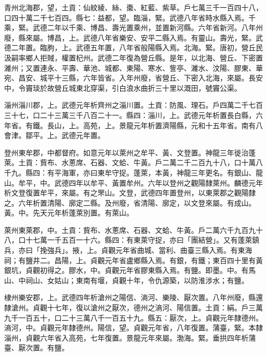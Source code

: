 \begin{pinyinscope}
 青州北海郡，望，土貢：仙紋綾、絲、棗、紅藍、紫草。戶七萬三千一百四十八，口四十萬二千七百四。縣七：益都，望。臨淄，緊。武德八年省時水縣入焉。千乘，緊。武德二年以千乘、博昌、壽光置乘州，並置新河縣。六年省新河。八年州廢，縣來屬。博昌，上。武德八年省樂安、安平二縣入焉。有靈山。壽光，緊。武德二年置。臨朐，上。武德五年置，八年省般陽縣入焉。北海。緊。唐初，營丘民汲嗣率鄉人拒賊，權置杞州。武德二年復為營丘縣。是年，以北海、營丘、下密置濰州；又置連永、平壽、華池、城都、東陽、寒水、訾亭、濰水、汶陽、膠東、華宛、昌安、城平十三縣，六年皆省。入年州廢，省營丘、下密入北海，來屬。長安中，令竇琰於故營丘城東北穿渠，引白浪水曲折三十里以溉田，號竇公渠。



 淄州淄川郡，上。武德元年析齊州之淄川置。土貢：防風、理石。戶四萬二千七百三十七，口二十三萬三千八百二十一。縣四：淄川，上。武德元年析置長白縣，六年省。有鐵。長山，上。高苑，上。景龍元年析置濟陽縣，元和十五年省。南有八會津。鄒平。上。武德元年置。



 登州東牟郡，中都督府。如意元年以萊州之牟平、黃、文登置。神龍三年徙治蓬萊。土貢：貲布、水蔥席、石器、文蛤、牛黃。戶二萬二千二百九十八，口十萬八千九。縣四：有平海軍，亦曰東牟守捉。蓬萊，本黃，神龍三年更名。有銀山、龍山。牟平，中。武德四年以牟平、黃置牟州。六年以登州之觀陽隸萊州。麟德元年析文登復置牟平，來屬。有之罘山。文登，武德四年置登州，以東萊郡之觀陽隸之。六年析置清陽、廓定二縣。及州廢，省清陽、廓定，以文登來屬。有成山。黃。中。先天元年析蓬萊別置。有萊山。



 萊州東萊郡，中。土貢：貲布、水蔥席、石器、文蛤、牛黃。戶二萬六千九百九十八，口十七萬一千五百一十六。縣四：有東萊守捉，亦曰「團結營」。又有蓬萊鎮兵，亦曰「挽強兵」。掖，上。貞觀元年省曲城、當利、曲臺三縣入焉。有東海祠；有鹽井二。昌陽，上。貞觀元年省盧鄉縣入焉。有銀，有鐵；東百四十里有黃銀坑，貞觀初得之。膠水，中。貞觀元年省膠東縣入焉。有鹽。即墨。中。有馬山、中祠山、女姑山；東南有堰，貞觀十年，令仇源築，以防淮涉水；有鹽。



 棣州樂安郡，上。武德四年析滄州之陽信、滳河、樂陵、厭次置。八年州廢，縣還隸滄州。貞觀十七年，復以滄州之厭次，德州之滳河、陽信置。土貢：絹。戶三萬九千一百五十，口二十三萬八千一百五十九。縣五：厭次，上。貞觀元年隸德州。滳河，中。貞觀元年隸德州。陽信，望。貞觀元年省，八年復置。蒲臺，緊。本隸淄州，貞觀六年省入高苑，七年復置。景龍元年來屬。渤海。緊。垂拱四年析蒲臺、厭次置。有鹽。




\end{pinyinscope}
